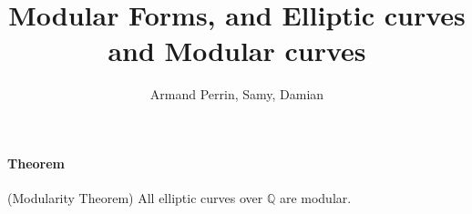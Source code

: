 \documentclass[letterpaper,10pt]{article}
\title{Modular Forms, and Elliptic curves and Modular curves}
\author{Armand Perrin, Samy, Damian}
\begin{document}
\maketitle%

\paragraph{ Theorem } (Modularity Theorem) All elliptic curves over $\mathbb{Q}$ are modular.

\cite{zhou}

\printbibliography %
\end{document}
